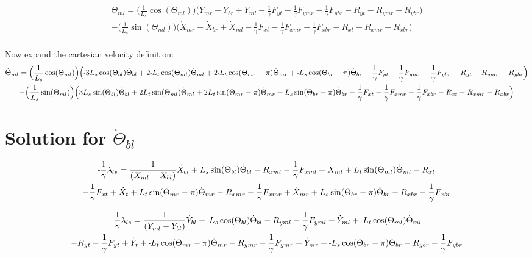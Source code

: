\documentclass[11pt, landscape]{article}
\newcommand{\mn}{\scalebox{0.7}[1.0]{-}}
\begin{document}
\begin{multline}
\dot{\Theta}_{ml} =
\Big(\frac{1}{L_s}\cos(\Theta_{ml})\Big) \Big(\dot{Y}_{mr} + \dot{Y}_{br} + \dot{Y}_{ml}
- \frac{1}{\gamma}F_{yt } - \frac{1}{\gamma}F_{ymr} - \frac{1}{\gamma}F_{ybr} - R_{yt} - R_{ymr} - R_{ybr} \Big) \\
- \Big(\frac{1}{L_s}\sin(\Theta_{ml})\Big)\Big(\dot{X}_{mr} + \dot{X}_{br} + \dot{X}_{ml}
- \frac{1}{\gamma}F_{xt } - \frac{1}{\gamma}F_{xmr} - \frac{1}{\gamma}F_{xbr} - R_{xt } - R_{xmr} - R_{xbr} \Big)
\end{multline}
\\
Now expand the cartesian velocity definition: \\

\begin{multline}
\dot{\Theta}_{ml} =
\Big(\frac{1}{L_s}\cos(\Theta_{ml})\Big) \Big(\mn3L_{s}\cos(\Theta_{bl})\dot{\Theta}_{bl} + 2\mn L_{t}\cos(\Theta_{ml})\dot{\Theta}_{ml} + 2\mn L_{t}\cos(\Theta_{mr}-\pi)\dot{\Theta}_{mr} + \mn L_{s}\cos(\Theta_{br}-\pi)\dot{\Theta}_{br}
- \frac{1}{\gamma}F_{yt } - \frac{1}{\gamma}F_{ymr} - \frac{1}{\gamma}F_{ybr} - R_{yt} - R_{ymr} - R_{ybr} \Big) \\
- \Big(\frac{1}{L_s}\sin(\Theta_{ml})\Big)\Big(3L_{s}\sin(\Theta_{bl})\dot{\Theta}_{bl} + 2L_{t}\sin(\Theta_{ml})\dot{\Theta}_{ml} + 2L_{t}\sin(\Theta_{mr}-\pi)\dot{\Theta}_{mr} + L_{s}\sin(\Theta_{br}-\pi)\dot{\Theta}_{br}
- \frac{1}{\gamma}F_{xt } - \frac{1}{\gamma}F_{xmr} - \frac{1}{\gamma}F_{xbr} - R_{xt } - R_{xmr} - R_{xbr} \Big)
\end{multline}


\section{Solution for $\dot{\Theta}_{bl}$}

\begin{multline}
\mn\frac{1}{\gamma}\lambda_{ls} =
\frac{1}{(X_{ml} - X_{bl})}\dot{X}_{bl} + L_{s}\sin(\Theta_{bl})      \dot{\Theta}_{bl} - R_{xml} - \frac{1}{\gamma}F_{xml} + \dot{X}_{ml} + L_{t}\sin(\Theta_{ml}) \dot{\Theta}_{ml} - R_{xt } \\
- \frac{1}{\gamma}F_{xt } + \dot{X}_{t } + L_{t}\sin(\Theta_{mr}-\pi)  \dot{\Theta}_{mr} - R_{xmr}
-\frac{1}{\gamma}F_{xmr} + \dot{X}_{mr} + L_{s}\sin(\Theta_{br}-\pi)  \dot{\Theta}_{br} - R_{xbr} - \frac{1}{\gamma}F_{xbr}
\end{multline}

\begin{multline}
\mn\frac{1}{\gamma}\lambda_{ls} =
\frac{1}{(Y_{ml} - Y_{bl})}\dot{Y}_{bl} + \mn L_{s}\cos(\Theta_{bl})      \dot{\Theta}_{bl} - R_{yml} - \frac{1}{\gamma}F_{yml} + \dot{Y}_{ml} + \mn L_{t}\cos(\Theta_{ml}) \dot{\Theta}_{ml} \\
- R_{yt} - \frac{1}{\gamma}F_{yt } + \dot{Y}_{t } + \mn L_{t}\cos(\Theta_{mr}-\pi)  \dot{\Theta}_{mr} - R_{ymr} - \frac{1}{\gamma}F_{ymr} + \dot{Y}_{mr}
+ \mn L_{s}\cos(\Theta_{br}-\pi)  \dot{\Theta}_{br} - R_{ybr} - \frac{1}{\gamma}F_{ybr}
\end{multline}
\end{document}
